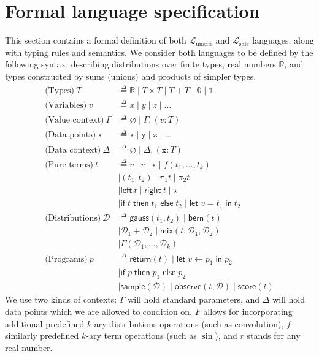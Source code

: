 \documentclass[preprint]{uai2026} %
\newcommand{\emptyctx}{\varnothing}
\newcommand{\emptytype}{\mathbb{0}}
\newcommand{\unittype}{\mathbb{1}}
\newcommand{\RR}{\mathbb{R}}
\newcommand{\Lsafe}{\mathcal{L}_{\text{safe}}}
\newcommand{\Lunsafe}{\mathcal{L}_{\text{unsafe}}}
\newcommand{\df}{\overset{\Delta}{=}}
\newcommand{\ifte}[3]{\mathsf{if}\;#1\;\mathsf{then}\;#2\;\mathsf{else}\;#3}
\newcommand{\letin}[3]{\mathsf{let}\;#1=#2\;\mathsf{in}\;#3}
\newcommand{\letbind}[3]{\mathsf{let}\;#1\leftarrow #2\;\mathsf{in}\;#3}
\newcommand{\gauss}[2]{\mathsf{gauss}(#1,#2)}
\newcommand{\bern}[1]{\mathsf{bern}(#1)}
\newcommand{\mix}[3]{\mathsf{mix}(#1;#2,#3)}
\newcommand{\dplus}[2]{#1 + #2}
\newcommand{\return}[1]{\mathsf{return}(#1)}
\newcommand{\sample}[1]{\mathsf{sample}(#1)}
\newcommand{\observe}[2]{\mathsf{observe}(#1,#2)}
\newcommand{\score}[1]{\mathsf{score}(#1)}
\newcommand{\datavar}[1]{\mathtt{#1}}
\begin{document}
\section{Formal language specification}\label{sec:formal-language-spec}
This section contains a formal definition of both $\Lunsafe$ and $\Lsafe$ languages, along with typing rules and semantics. We consider both languages to be defined by the following syntax, describing distributions over finite types, real numbers $\mathbb{R}$, and types constructed by sums (unions) and products of simpler types.
\begin{align*}
\text{(Types)}\ T &\df \RR \mid T\times T \mid T + T \mid \emptytype \mid \unittype \\
\text{(Variables)}\ v &\df x \mid y \mid z \mid \ldots \\
\text{(Value context)}\ \Gamma &\df \emptyctx \mid \Gamma,(v:T) \\
\text{(Data points)}\ \datavar{x} &\df \datavar{x} \mid \datavar{y} \mid \datavar{z} \mid \ldots \\
\text{(Data context)}\ \Delta &\df \emptyctx \mid \Delta,(\datavar{x}:T) \\
\text{(Pure terms)}\ t &\df v \mid r \mid \datavar{x} \mid f(t_1,\ldots,t_k) \\
&\mid (t_1,t_2) \mid \pi_1 t \mid \pi_2 t \\
&\mid \mathsf{left}\ t \mid \mathsf{right}\ t \mid \star \\
&\mid \ifte{t}{t_1}{t_2} \mid \letin{v}{t_1}{t_2} \\
\text{(Distributions)}\ \mathcal{D} &\df \gauss{t_1}{t_2} \mid \bern{t} \\
&\mid \dplus{\mathcal{D}_1}{\mathcal{D}_2} \mid \mix{t}{\mathcal{D}_1}{\mathcal{D}_2} \\
&\mid F(\mathcal{D}_1,\ldots,\mathcal{D}_k) \\
\text{(Programs)}\ p &\df \return{t} \mid \letbind{v}{p_1}{p_2}\\
&\mid \ifte{p}{p_1}{p_2} \\
&\mid \sample{\mathcal{D}} \mid \observe{t}{\mathcal{D}} \mid \score{t}
\end{align*}
We use two kinds of contexts: $\Gamma$ will hold standard parameters, and $\Delta$ will hold data points which we are allowed to condition on. $F$ allows for incorporating additional predefined $k$-ary distributions operations (such as convolution), $f$ similarly predefined $k$-ary term operations (such as $\sin$), and $r$ stands for any real number.
\end{document}

